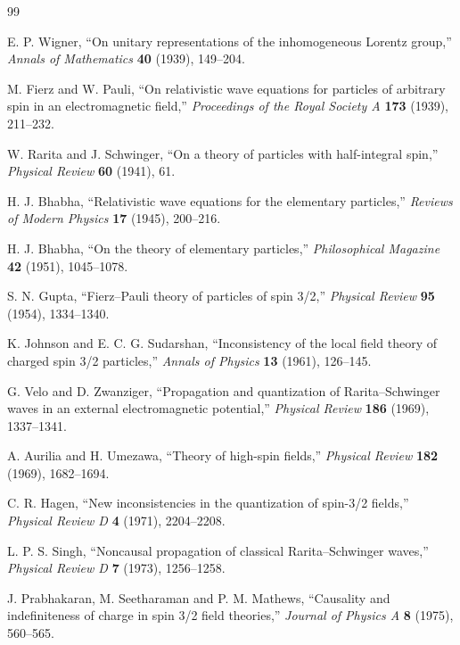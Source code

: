 \documentclass[11pt,a4paper]{article}
\numberwithin{equation}{section}
\begin{document}
\begin{thebibliography}{99}

E. P. Wigner,
``On unitary representations of the inhomogeneous Lorentz group,''
\emph{Annals of Mathematics} \textbf{40} (1939), 149--204.

M. Fierz and W. Pauli,
``On relativistic wave equations for particles of arbitrary spin in an electromagnetic field,''
\emph{Proceedings of the Royal Society A} \textbf{173} (1939), 211--232.

W. Rarita and J. Schwinger,
``On a theory of particles with half-integral spin,''
\emph{Physical Review} \textbf{60} (1941), 61.

H. J. Bhabha,
``Relativistic wave equations for the elementary particles,''
\emph{Reviews of Modern Physics} \textbf{17} (1945), 200--216.

H. J. Bhabha,
``On the theory of elementary particles,''
\emph{Philosophical Magazine} \textbf{42} (1951), 1045--1078.

S. N. Gupta,
``Fierz--Pauli theory of particles of spin 3/2,''
\emph{Physical Review} \textbf{95} (1954), 1334--1340.

K. Johnson and E. C. G. Sudarshan,
``Inconsistency of the local field theory of charged spin 3/2 particles,''
\emph{Annals of Physics} \textbf{13} (1961), 126--145.

G. Velo and D. Zwanziger,
``Propagation and quantization of Rarita--Schwinger waves in an external electromagnetic potential,''
\emph{Physical Review} \textbf{186} (1969), 1337--1341.

A. Aurilia and H. Umezawa,
``Theory of high-spin fields,''
\emph{Physical Review} \textbf{182} (1969), 1682--1694.

C. R. Hagen,
``New inconsistencies in the quantization of spin-3/2 fields,''
\emph{Physical Review D} \textbf{4} (1971), 2204--2208.

L. P. S. Singh,
``Noncausal propagation of classical Rarita--Schwinger waves,''
\emph{Physical Review D} \textbf{7} (1973), 1256--1258.

J. Prabhakaran, M. Seetharaman and P. M. Mathews,
``Causality and indefiniteness of charge in spin 3/2 field theories,''
\emph{Journal of Physics A} \textbf{8} (1975), 560--565.


\end{thebibliography}
\end{document}

